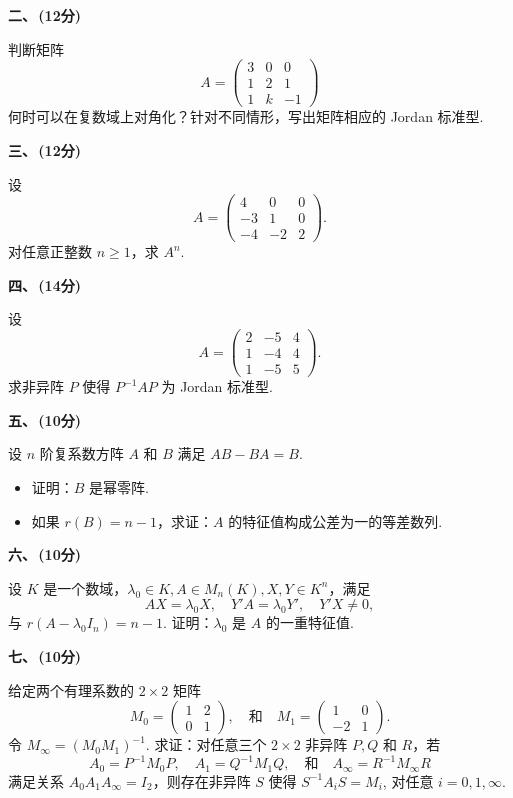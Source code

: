\textbf{二、\,(12分)}

判断矩阵 
$$A = \begin{pmatrix}
    3 & 0 & 0 \\
    1 & 2 & 1 \\
    1 & k & -1
\end{pmatrix}$$ 
何时可以在复数域上对角化？针对不同情形，写出矩阵相应的 Jordan 标准型.

\textbf{三、\,(12分)}

设 
$$A = \begin{pmatrix}
    4 & 0 & 0 \\
    -3 & 1 & 0 \\
    -4 & -2 & 2
\end{pmatrix}.$$
对任意正整数 $n \ge 1$，求 $A^n$.

\textbf{四、\,(14分)}

设 
$$A = \begin{pmatrix}
    2 & -5 & 4 \\
    1 & -4 & 4 \\
    1 & -5 & 5
\end{pmatrix}.$$
求非异阵 $P$ 使得 $P^{-1}AP$ 为 Jordan 标准型.

\textbf{五、\,(10分)}

设 $n$ 阶复系数方阵 $A$ 和 $B$ 满足 $AB - BA = B$.
\begin{itemize}
    \item 证明：$B$ 是幂零阵.
    \item 如果 $r(B) = n - 1$，求证：$A$ 的特征值构成公差为一的等差数列.
\end{itemize}

\textbf{六、\,(10分)}

设 $K$ 是一个数域，$\lambda_0 \in K, A \in M_n(K), X, Y \in K^n$，满足
$$AX = \lambda_0 X, \quad Y'A = \lambda_0 Y', \quad Y'X \neq 0,$$
与 $r(A - \lambda_0 I_n) = n - 1$. 证明：$\lambda_0$ 是 $A$ 的一重特征值.

\textbf{七、\,(10分)}

给定两个有理系数的 $2 \times 2$ 矩阵
$$M_0 = \begin{pmatrix}
    1 & 2 \\
    0 & 1
\end{pmatrix}, \quad \text{和} \quad M_1 = \begin{pmatrix}
    1 & 0 \\
    -2 & 1
\end{pmatrix}.$$
令 $M_{\infty} = (M_0M_1)^{-1}$. 求证：对任意三个 $2 \times 2$ 非异阵 $P, Q$ 和 $R$，若
$$A_0 = P^{-1}M_0P, \quad A_1 = Q^{-1}M_1Q, \quad \text{和} \quad A_{\infty} = R^{-1}M_{\infty}R$$
满足关系 $A_0A_1A_{\infty} = I_2$，则存在非异阵 $S$ 使得 $S^{-1}A_iS = M_i$, 对任意 $i = 0, 1, \infty$.



